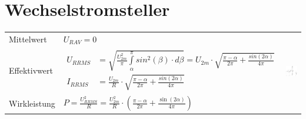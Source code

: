 \section{Wechselstromsteller}

\begin{tabu}{|l|l|p{0.3\textwidth}}
    Mittelwert & $U_{R AV} = 0$
    & \\
    Effektivwert & {$\begin{aligned}
                        U_{R RMS} &= \sqrt{\frac{U_{2m}^2}{\pi}\int\limits_{\alpha}^{\pi}sin^2(\beta) \cdot d\beta} = U_{2m} \cdot \sqrt{\frac{\pi-\alpha}{2\pi}+\frac{sin(2\alpha)}{4\pi}}\\
                        I_{R RMS} &=  \frac{U_{2m}}{R} \cdot \sqrt{\frac{\pi-\alpha}{2\pi}+\frac{sin(2\alpha)}{4\pi}}
                    \end{aligned}$
                   }\\
    Wirkleistung & $P = \frac{U_{R RMS}^2}{R} = \frac{U_{2m}^2}{R} \cdot \left( \frac{\pi-\alpha}{2\pi} + \frac{\sin(2\alpha)}{4\pi}\right) $\\
\end{tabu}
